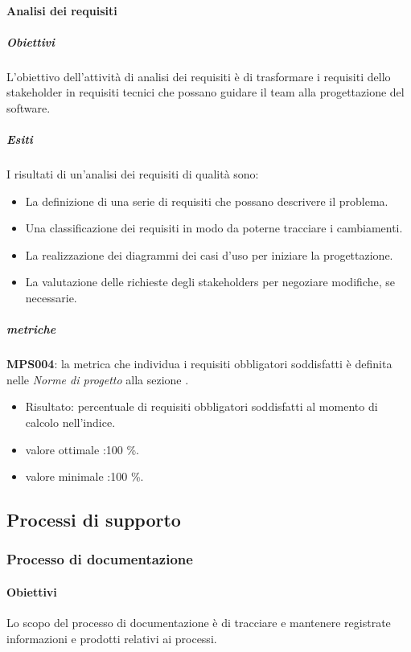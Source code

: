 \documentclass[../piano-di-qualifica.tex]{subfiles}
\begin{document}
\paragraph{Analisi dei requisiti}%
\label{par:analisi_dei_requisiti}

\subparagraph{Obiettivi}%
\label{par:obiettivi}
L'obiettivo dell'attività di analisi dei requisiti è di trasformare i requisiti dello stakeholder in requisiti tecnici che possano guidare il team alla progettazione del software.

\subparagraph{Esiti}
\label{par:esiti}
I risultati di un'analisi dei requisiti di qualità sono:
\begin{itemize}
	\item La definizione di una serie di requisiti che possano descrivere il problema.
	\item Una classificazione dei requisiti in modo da poterne tracciare i cambiamenti.
	\item La realizzazione dei diagrammi dei casi d'uso per iniziare la progettazione.
	\item La valutazione delle richieste degli stakeholders per negoziare modifiche, se necessarie.
\end{itemize}

\subparagraph{metriche}
\label{par:metriche}

\textbf{MPS004}: la metrica che individua i requisiti obbligatori soddisfatti è definita nelle \textit{Norme di progetto} alla sezione .
\begin{itemize}
	\item Risultato: percentuale di requisiti obbligatori soddisfatti al momento di calcolo nell'indice.
	\item valore ottimale :100 \%.
	\item valore minimale :100 \%.
\end{itemize}

\subsection{Processi di supporto}%
\label{sub:processi_di_supporto}

\subsubsection{Processo di documentazione}%
\label{subs:processo_di_documentazione}

\paragraph{Obiettivi}
\label{par:obiettivi}
Lo scopo del processo di documentazione è di tracciare e mantenere registrate informazioni e prodotti relativi ai processi.
\end{document}
